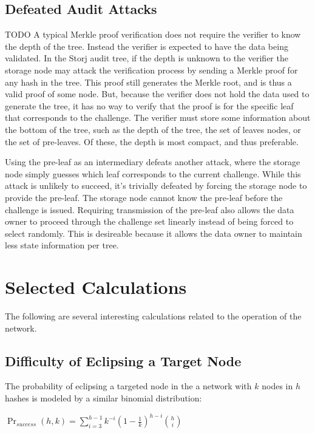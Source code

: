 \documentclass[a4paper,10pt]{article} \usepackage[utf8]{inputenc}
\newcommand{\todo}[1]{{\color{red} TODO #1 }}
\begin{document}
\subsection{Defeated Audit Attacks}

\todo{ A typical Merkle proof verification does not require the verifier to know
the depth of the tree. Instead the verifier is expected to have the data being
validated. In the Storj audit tree, if the depth is unknown to the verifier the
storage node may attack the verification process by sending a Merkle proof for 
any
hash in the tree. This proof still generates the Merkle root, and is thus a
valid proof of some node. But, because the verifier does not hold the data used
to generate the tree, it has no way to verify that the proof is for the specific
leaf that corresponds to the challenge. The verifier must store some information
about the bottom of the tree, such as the depth of the tree, the set of leaves
nodes, or the set of pre-leaves. Of these, the depth is most compact, and thus
preferable.

Using the pre-leaf as an intermediary defeats another attack, where the storage 
node
simply guesses which leaf corresponds to the current challenge. While this
attack is unlikely to succeed, it's trivially defeated by forcing the storage 
node to
provide the pre-leaf. The storage node cannot know the pre-leaf before the 
challenge
is issued. Requiring transmission of the pre-leaf also allows the data owner to
proceed through the challenge set linearly instead of being forced to select
randomly. This is desireable because it allows the data owner to maintain less
state information per tree. }

\section{Selected Calculations}

The following are several interesting calculations related to the operation of
the network.

\subsection{Difficulty of Eclipsing a Target Node}

The probability of eclipsing a targeted node in the a network with $ k $ nodes
in $ h $ hashes is modeled by a similar binomial distribution:

{\centering $\Pr_{success}(h, k) = \displaystyle \sum_{i=3}^{h-1}
k^{-i}(1-\frac{1}{k})^{h-i}{h \choose i}$ \\}
\end{document}
